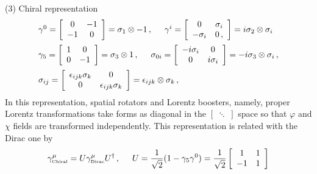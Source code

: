 \noindent
(3) Chiral representation\\
\begin{eqnarray}
\begin{array}{l}
\gamma^0
=
\left[
\begin{array}{cc}
0 & -1 \\ -1 & 0
\end{array}
\right]
= \sigma_1 \otimes -1
\,,
\hspace{5mm}
\gamma^i
=
\left[
\begin{array}{cc}
0  & \sigma_i \\  -\sigma_i & 0\,,
\end{array}
\right]
=
i\sigma_2 \otimes \sigma_i
\vspace{2mm}
\\ %
\gamma_5
=
\left[
\begin{array}{cc}
1 & 0 \\ 0 & -1
\end{array}
\right]
= \sigma_3 \otimes 1
\,,
\hspace{5mm}
\sigma_{0i}
=
\left[
\begin{array}{cc}
-i\sigma_i & 0 \\  0 & i\sigma_i
\end{array}
\right]
=
-i\sigma_3 \otimes \sigma_i\,,
\vspace{2mm}
\\ %
\sigma_{ij}
=
\left[
\begin{array}{cc}
\epsilon_{ijk}\sigma_k & 0 \\  0 & \epsilon_{ijk}\sigma_k
\end{array}
\right]
=
\epsilon_{ijk} \otimes \sigma_k\,,
\end{array}
\end{eqnarray}
In this representation, spatial rotators and Lorentz boosters, namely, proper Lorentz transformations
take forms as diagonal in the $\left[\;\ddots\;\right]$ space so that $\varphi$ and $\chi$ fields
are transformed independently. This representation is related with the Dirac one by
\begin{eqnarray}
\gamma^\mu_{\mbox{\tiny Chiral}}
= U \gamma^\mu_{\mbox{\tiny Dirac}} U^{\dagger}\,,
\hspace{5mm}
U = 
\frac{1}{\sqrt{2}}
(1 - \gamma_5 \gamma^0)
=
\frac{1}{\sqrt{2}}
\left[
\begin{array}{cc}
1 & 1 \\
-1 & 1
\end{array}
\right]
\end{eqnarray}\\

